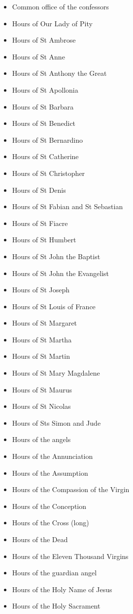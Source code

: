 \documentclass[a4paper,12pt,twoside]{book}
\begin{document}
	\begin{itemize}
\item Common office of the confessors
\item Hours of Our Lady of Pity
\item Hours of St Ambrose
\item Hours of St Anne
\item Hours of St Anthony the Great
\item Hours of St Apollonia
\item Hours of St Barbara
\item Hours of St Benedict
\item Hours of St Bernardino
\item Hours of St Catherine
\item Hours of St Christopher
\item Hours of St Denis
\item Hours of St Fabian and St Sebastian
\item Hours of St Fiacre
\item Hours of St Humbert
\item Hours of St John the Baptist
\item Hours of St John the Evangelist
\item Hours of St Joseph
\item Hours of St Louis of France
\item Hours of St Margaret
\item Hours of St Martha
\item Hours of St Martin
\item Hours of St Mary Magdalene
\item Hours of St Maurus
\item Hours of St Nicolas
\item Hours of Sts Simon and Jude
\item Hours of the angels
\item Hours of the Annunciation
\item Hours of the Assumption
\item Hours of the Compassion of the Virgin
\item Hours of the Conception
\item Hours of the Cross (long)
\item Hours of the Dead
\item Hours of the Eleven Thousand Virgins
\item Hours of the guardian angel
\item Hours of the Holy Name of Jesus
\item Hours of the Holy Sacrament

\end{itemize}
\end{document}
